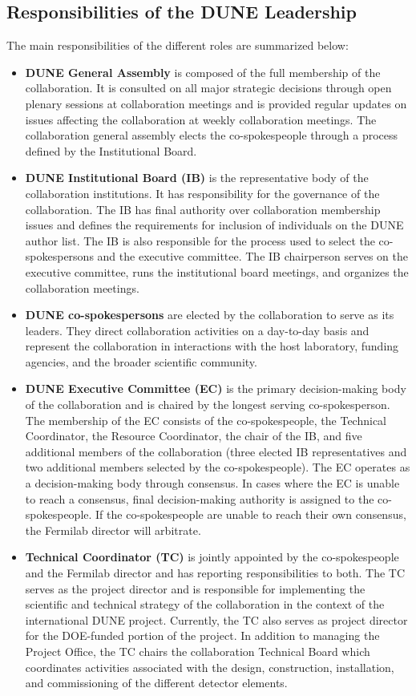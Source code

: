 \subsection{Responsibilities of the DUNE Leadership}

The main responsibilities of the different roles are summarized below:
\begin{itemize}
  \item \textbf{DUNE General Assembly} is composed of the full membership of the collaboration.  It is consulted on all major strategic decisions through open plenary sessions at collaboration meetings and is provided regular updates on issues affecting the collaboration at weekly collaboration meetings.  The collaboration general assembly elects the co-spokespeople through a process defined by the Institutional Board. 
  \item \textbf{DUNE Institutional Board (IB)} is the representative body of the collaboration institutions. It has  responsibility for the governance of the collaboration. The IB has final authority over collaboration membership issues and defines the requirements for inclusion of individuals on the DUNE author list. The IB is also responsible for the process used to select the co-spokespersons and the executive committee.  The IB chairperson serves on the executive committee, runs the institutional board meetings, and organizes the collaboration meetings.  
  \item \textbf{DUNE co-spokespersons} are elected by the collaboration to serve as its leaders.  They direct collaboration activities on a day-to-day basis and represent the collaboration in interactions with the host laboratory, funding agencies, and the broader scientific community.
  \item \textbf{DUNE Executive Committee (EC)} is the primary decision-making body of the collaboration and is chaired by the longest serving co-spokesperson.  The membership of the EC consists of the co-spokespeople, the Technical Coordinator, the Resource Coordinator, the chair of the IB, and five additional members of the collaboration (three elected IB representatives and two additional members selected by the co-spokespeople).  The EC operates as a decision-making body through consensus.  In cases where the EC is unable to reach a consensus, final decision-making authority is assigned to the co-spokespeople.  If the co-spokespeople are unable to reach their own consensus, the Fermilab director will arbitrate.   
  \item \textbf{Technical Coordinator (TC)} is jointly appointed by the co-spokespeople and the Fermilab director and has reporting responsibilities to both.  The TC serves as the project director and is responsible for implementing the scientific and technical strategy of the collaboration in the context of the international DUNE project.  Currently, the TC also serves as project director for the DOE-funded portion of the project.  In addition to managing the Project Office, the TC chairs the collaboration Technical Board which coordinates activities associated with the design, construction, installation, and commissioning of the different detector elements.   

\end{itemize}
